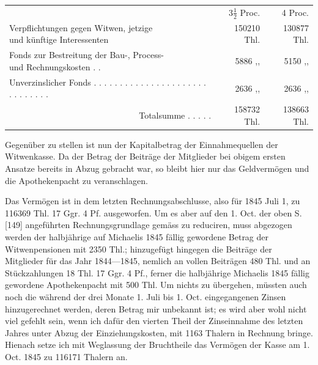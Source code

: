\begin{center}
\fontsize{8}{9.6}\selectfont\setlength{\tabcolsep}{3pt}
\begin{tabular}{l r|r}
&\(3\tfrac{1}{2}\) Proc.&4 Proc.\\
\shortstack[l]{Verpflichtungen gegen Witwen, jetzige\\und künftige Interessenten}&150210 Thl.&130877 Thl.\\
\shortstack[l]{Fonds zur Bestreitung der Bau-, Process-\\und Rechnungskosten . .}&5886 ,, &5150 ,, \\
Unverzinslicher Fonds . . . . . . . . . . . . . . . . . . . . . . . . . . . . . .&2636 ,, &2636 ,, \\\cline{2-3}
\multicolumn{1}{r}{Totalsumme . . . . .}&158732 Thl.&138663 Thl.
\end{tabular}
\end{center}
\noindent\hspace*{\parindent}Gegenüber zu stellen ist nun der Kapitalbetrag der Einnahmequellen der Witwenkasse. Da der Betrag der Beiträge der Mitglieder bei obigem ersten Ansatze bereits in Abzug gebracht war, so bleibt hier nur das Geldvermögen und die Apothekenpacht zu veranschlagen.

Das Vermögen ist in dem letzten Rechnungsabschlusse, also für 1845 Juli 1, zu 116369 Thl. 17 Ggr. 4 Pf. ausgeworfen. Um es aber auf den 1. Oct. der oben S. [149] angeführten Rechnungsgrundlage gemäss zu reduciren, muss abgezogen werden der halbjährige auf Michaelis 1845 fällig gewordene Betrag der Witwenpensionen mit 2350 Thl.; hinzugefügt hingegen die Beiträge der Mitglieder für das Jahr 1844—1845, nemlich an vollen Beiträgen 480 Thl. und an Stückzahlungen 18 Thl. 17 Ggr. 4 Pf., ferner die halbjährige Michaelis 1845 fällig gewordene Apothekenpacht mit 500 Thl. Um nichts zu übergehen, müssten auch noch die während der drei Monate 1. Juli bis 1. Oct. eingegangenen Zinsen hinzugerechnet werden, deren Betrag mir unbekannt ist; es wird aber wohl nicht viel gefehlt sein, wenn ich dafür den vierten Theil der Zinseinnahme des letzten Jahres unter Abzug der Einziehungskosten, mit 1163 Thalern in Rechnung bringe. Hienach setze ich mit Weglassung der Bruchtheile das Vermögen der Kasse am 1. Oct. 1845 zu 116171 Thalern an.

